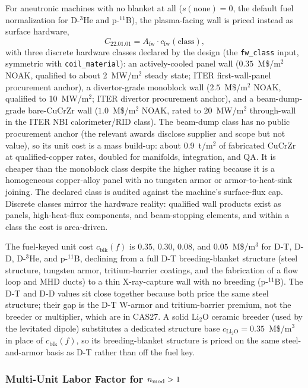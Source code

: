 \documentclass{article}
\begin{document}
For aneutronic machines with no blanket at all ($s(\mathrm{none}) = 0$, the
default fuel normalization for D-${}^3$He and p-${}^{11}$B), the
plasma-facing wall is priced instead as surface hardware,
\begin{equation}
\label{eq:cas2201fw}
C_{22.01.01} = A_{\text{fw}} \cdot c_{\text{fw}}(\text{class}),
\end{equation}
with three discrete hardware classes declared by the design (the
\texttt{fw\_class} input, symmetric with \texttt{coil\_material}): an
actively-cooled panel wall ($0.35$~M\$/m$^2$ NOAK, qualified to about
2~MW/m$^2$ steady state; ITER first-wall-panel procurement anchor), a
divertor-grade monoblock wall ($2.5$~M\$/m$^2$ NOAK, qualified to
10~MW/m$^2$; ITER divertor procurement anchor), and a beam-dump-grade
bare-CuCrZr wall ($1.0$~M\$/m$^2$ NOAK, rated to 20~MW/m$^2$ through-wall
in the ITER NBI calorimeter/RID class). The beam-dump class has no public
procurement anchor (the relevant awards disclose supplier and scope but not
value), so its unit cost is a mass build-up: about 0.9~t/m$^2$ of
fabricated CuCrZr at qualified-copper rates, doubled for manifolds,
integration, and QA. It is cheaper than the monoblock class despite the
higher rating because it is a homogeneous copper-alloy panel with no
tungsten armor or armor-to-heat-sink joining. The declared class is
audited against the machine's surface-flux cap. Discrete classes mirror the
hardware reality: qualified wall products exist as panels,
high-heat-flux components, and beam-stopping elements, and within a class
the cost is area-driven.

The fuel-keyed unit cost $c_{\text{blk}}(f)$ is $0.35$, $0.30$, $0.08$,
and $0.05$~M\$/m$^3$ for D-T, D-D, D-${}^3$He, and p-${}^{11}$B, declining
from a full D-T breeding-blanket structure (steel structure, tungsten armor,
tritium-barrier coatings, and the fabrication of a flow loop and MHD ducts) to
a thin X-ray-capture wall with no breeding (p-${}^{11}$B). The D-T and D-D
values sit close together because both price the same steel structure; their
gap is the D-T W-armor and tritium-barrier premium, not the breeder or
multiplier, which are in CAS27. A solid Li$_2$O ceramic breeder (used by the
levitated dipole) substitutes a dedicated structure base
$c_{\text{Li}_2\text{O}} = 0.35$~M\$/m$^3$ in place of $c_{\text{blk}}(f)$, so
its breeding-blanket structure is priced on the same steel-and-armor basis as
D-T rather than off the fuel key.

\subsubsection*{Multi-Unit Labor Factor for $n_{\rm mod}>1$}
\label{sec:multi-unit-labor}
\end{document}

